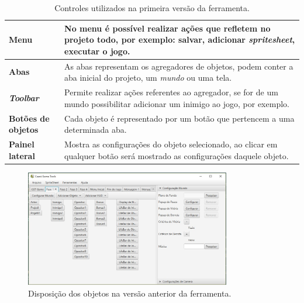 \documentclass[12pt,twoside,openright,a4paper,english,brazil,sumario=tradicional]{abntex2}
\begin{document}
\begin{table}[h]
   \centering
   \begin{tabular}{| l | p{8cm} |}
      \hline
      \textbf{Menu} & No menu é possível realizar ações que refletem no projeto todo, por exemplo: salvar, adicionar \emph{spritesheet}, executar o jogo. \\
      \hline
      \textbf{Abas} & As abas representam os agregadores de objetos, podem conter a aba inicial do projeto, um \emph{mundo} ou uma tela. \\
      \hline
      \textbf{\emph{Toolbar}} & Permite realizar ações referentes ao agregador, se for de um mundo possibilitar adicionar um inimigo ao jogo, por exemplo. \\
      \hline
      \textbf{Botões de objetos} & Cada objeto é representado por um botão que pertencem a uma determinada aba. \\
      \hline
      \textbf{Painel lateral} & Mostra as configurações do objeto selecionado, ao clicar em qualquer botão será mostrado as configurações daquele objeto.  \\
      \hline
   \end{tabular}
   \caption{Controles utilizados na primeira versão da ferramenta.}
   \label{table:ferramenta_areas}
\end{table}

\begin{figure}[h]
\centering
\includegraphics[width=0.8\textwidth]{images/objetos_disposicao.jpg}
\caption{Disposição dos objetos na versão anterior da ferramenta.}
\label{fig:objetos_disp}
\end{figure}
\end{document}

